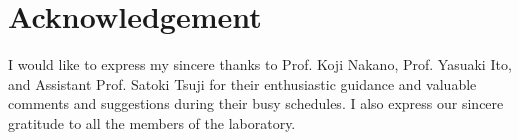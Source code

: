 \documentclass[12pt]{report}
\begin{document}
\chapter*{Acknowledgement}
I would like to express my sincere thanks to Prof. Koji Nakano, Prof. Yasuaki Ito, and Assistant Prof. Satoki Tsuji for their enthusiastic guidance and valuable comments and suggestions during their busy schedules. I also express our sincere gratitude to all the members of the laboratory.





\end{document}
